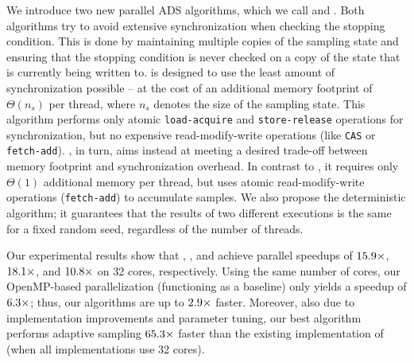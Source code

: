 %
We introduce two new parallel ADS algorithms, which we call \localframe
and \sharedframe.
Both algorithms try to avoid extensive synchronization when checking the
stopping condition. This is done by maintaining multiple copies of the sampling state
and ensuring that the stopping condition is never checked on a copy
of the state that is currently being written to.
%
\Localframe is designed to use the least amount of synchronization possible
-- at the cost of an additional memory footprint of
$\Theta(n_s)$ per thread, where $n_s$ denotes the size of the sampling
state.
%
This algorithm performs only atomic \texttt{load-acquire} and
\texttt{store-release} operations for synchronization, but no
expensive read-modify-write operations (like \texttt{CAS} or \texttt{fetch-add}).
%
\Sharedframe, in turn, aims instead at meeting a
desired trade-off between memory footprint and synchronization overhead.
In contrast to \localframe, it requires only $\Theta(1)$
additional memory per thread, but
uses atomic read-modify-write operations (\eg \texttt{fetch-add}) to accumulate samples.
%
We also propose the deterministic \indexedframe algorithm; it
guarantees that the results of two different executions is the same
for a fixed random seed, regardless of the number of threads.

Our experimental results show that \localframe, \sharedframe, and \indexedframe
achieve parallel speedups of $\onedigit{\adsParallelSuLf}\times$,
$\onedigit{\adsParallelSuSf}\times$,
and $\onedigit{\adsParallelSuDt}\times$ on 32 cores, respectively.
Using the same number of cores, our OpenMP-based parallelization (functioning as a baseline)
only yields a speedup of $\onedigit{\adsParallelSuNaive}\times$;
thus, our algorithms are up to $\onedigit{\adsSuSfVsOmp}\times$ faster.
Moreover, also due to implementation improvements and parameter tuning,
our best algorithm performs adaptive sampling $\onedigit{\adsSuSfVsOriginal}\times$
faster than the existing implementation of \kadabra (when all implementations use 32 cores).

